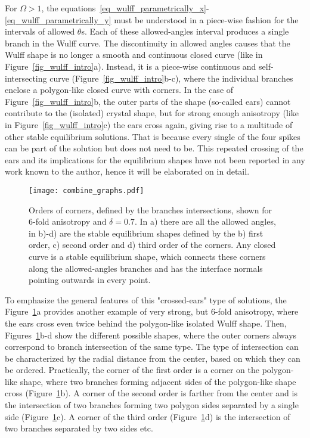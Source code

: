 	For $\Omega>1$, the equations~\eqref{eq_wulff_parametrically_x}-\eqref{eq_wulff_parametrically_y} must be understood in a piece-wise fashion for the intervals of allowed $\theta$s. Each of these allowed-angles interval produces a single branch in the Wulff curve. The discontinuity in allowed angles causes that the Wulff shape is no longer a smooth and continuous closed curve (like in Figure~\ref{fig_wulff_intro}a). Instead, it is a piece-wise continuous and self-intersecting curve (Figure~\ref{fig_wulff_intro}b-c), where the individual branches enclose a polygon-like closed curve with corners. In the case of Figure~\ref{fig_wulff_intro}b, the outer parts of the shape (so-called ears) cannot contribute to the (isolated) crystal shape, but for strong enough anisotropy (like in Figure~\ref{fig_wulff_intro}c) the ears cross again, giving rise to a multitude of other stable equilibrium solutions. That is because every single of the four spikes can be part of the solution but does not need to be. This repeated crossing of the ears and its implications for the equilibrium shapes have not been reported in any work known to the author, hence it will be elaborated on in detail. 
	
	\begin{figure}[h]
		\centering
		\texttt{[image: combine\_graphs.pdf]}
		\caption[Orders of Wulff shape corners, defined by the branches intersections, shown for 6-fold anisotropy and $\delta=0.7$]{Orders of corners, defined by the branches intersections, shown for 6-fold anisotropy and $\delta=0.7$. In a) there are all the allowed angles, in b)-d) are the stable equilibrium shapes defined by the b) first order, c) second order and d) third order of the corners. Any closed curve is a stable equilibrium shape, which connects these corners along the allowed-angles branches and has the interface normals pointing outwards in every point.}
		\label{fig_wulff_cross_orders}
	\end{figure}
	
	To emphasize the general features of this "crossed-ears" type of solutions, the Figure~\ref{fig_wulff_cross_orders}a provides another example of very strong, but 6-fold anisotropy, where the ears cross even twice behind the polygon-like isolated Wulff shape. Then, Figures~\ref{fig_wulff_cross_orders}b-d show the different possible shapes, where the outer corners always correspond to branch intersection of the same type. The type of intersection can be characterized by the radial distance from the center, based on which they can be ordered. Practically, the corner of the first order is a corner on the polygon-like shape, where two branches forming adjacent sides of the polygon-like shape cross (Figure~\ref{fig_wulff_cross_orders}b). A corner of the second order is farther from the center and is the intersection of two branches forming two polygon sides separated by a single side (Figure~\ref{fig_wulff_cross_orders}c). A corner of the third order (Figure~\ref{fig_wulff_cross_orders}d) is the intersection of two branches separated by two sides etc.
	
